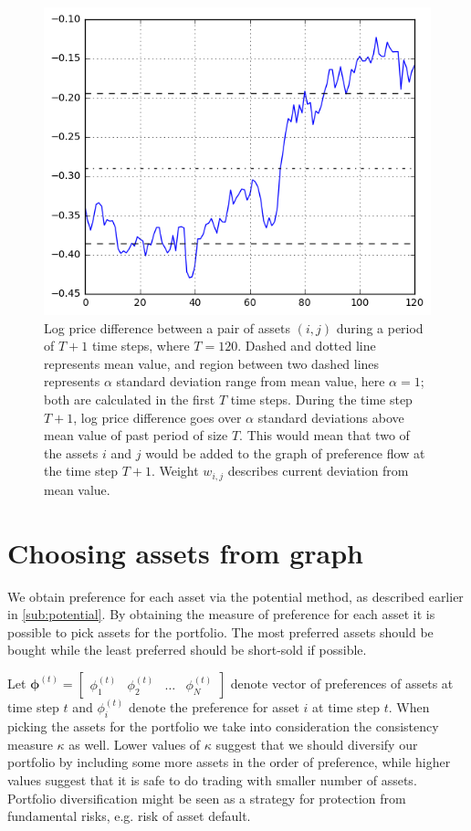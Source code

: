 \documentclass[lmodern, utf8, diplomski]{fer}
\newcommand{\matr}[1]{\mathbold{#1}}
\begin{document}
  \begin{figure}[h]
    \centering
    \includegraphics[width=0.9\columnwidth]{graphics/deviation-magnitude.png}
    \caption{Log price difference between a pair of assets $(i, j)$ during a period of $T + 1$ time steps, where $T = 120$.
      Dashed and dotted line represents mean value, and region between two dashed lines represents $\alpha$ standard deviation range from mean value, here $\alpha = 1$; both are calculated in the first $T$ time steps.
      During the time step $T + 1$, log price difference goes over $\alpha$ standard deviations above mean value of past period of size $T$.
      This would mean that two of the assets $i$ and $j$ would be added to the graph of preference flow at the time step $T + 1$.
      Weight $w_{i,j}$ describes current deviation from mean value.}
    \label{fig:devmag}
  \end{figure}
  
  \section{Choosing assets from graph}
  We obtain preference for each asset via the potential method, as described earlier in \ref{sub:potential}.
  By obtaining the measure of preference for each asset it is possible to pick assets for the portfolio.
  The most preferred assets should be bought while the least preferred should be short-sold if possible.
  
  Let $\matr{\phi}^{(t)} = \begin{bmatrix} \phi_1^{(t)} & \phi_2^{(t)} & \ldots & \phi_N^{(t)} \end{bmatrix}$ denote vector of preferences of assets at time step $t$ and $\phi_i^{(t)}$ denote the preference for asset $i$ at time step $t$.
  When picking the assets for the portfolio we take into consideration the consistency measure $\kappa$ as well.
  Lower values of $\kappa$ suggest that we should diversify our portfolio by including some more assets in the order of preference, while higher values suggest that it is safe to do trading with smaller number of assets.
  Portfolio diversification might be seen as a strategy for protection from fundamental risks, e.g. risk of asset default.
  
\end{document}
